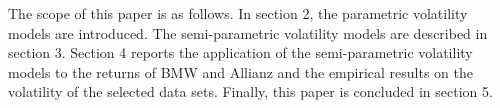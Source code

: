 The scope of this paper is as follows. In section 2, the parametric volatility models are introduced. The semi-parametric volatility models are described in section 3. Section 4 reports the application of the semi-parametric volatility models to the returns of BMW and Allianz and the empirical results on the volatility of the selected data sets. Finally, this paper is concluded in section 5.